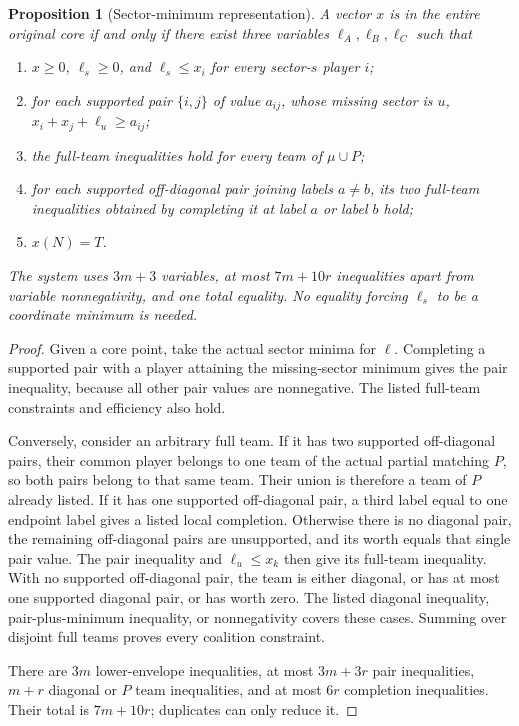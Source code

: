 \documentclass[11pt]{article}
\newtheorem{proposition}[theorem]{Proposition}
\theoremstyle{remark}
\begin{document}
\begin{proposition}[Sector-minimum representation]\label{anc:compression}
A vector $x$ is in the entire original core if and only if there exist
three variables $\ell_A,\ell_B,\ell_C$ such that
\begin{enumerate}
\item $x\ge0$, $\ell_s\ge0$, and $\ell_s\le x_i$ for every sector-$s$
player $i$;
\item for each supported pair $\{i,j\}$ of value $a_{ij}$, whose missing
sector is $u$, $x_i+x_j+\ell_u\ge a_{ij}$;
\item the full-team inequalities hold for every team of $\mu\cup P$;
\item for each supported off-diagonal pair joining labels $a\ne b$, its
two full-team inequalities obtained by completing it at label $a$ or
label $b$ hold;
\item $x(N)=T$.
\end{enumerate}
The system uses $3m+3$ variables, at most $7m+10r$ inequalities apart
from variable nonnegativity, and one total equality. No equality forcing
$\ell_s$ to be a coordinate minimum is needed.
\end{proposition}
\begin{proof}
Given a core point, take the actual sector minima for $\ell$.
Completing a supported pair with a player attaining the missing-sector
minimum gives the pair inequality, because all other pair values are
nonnegative. The listed full-team constraints and efficiency also hold.

Conversely, consider an arbitrary full team. If it has two supported
off-diagonal pairs, their common player belongs to one team of the
actual partial matching $P$, so both pairs belong to that same team.
Their union is therefore a team of $P$ already listed. If it has one
supported off-diagonal pair, a third label equal to one endpoint label
gives a listed local completion. Otherwise there is no diagonal pair,
the remaining off-diagonal pairs are unsupported, and its worth equals
that single pair value. The pair inequality and $\ell_u\le x_k$
then give its full-team inequality. With no supported off-diagonal
pair, the team is either diagonal, or has at most one supported diagonal
pair, or has worth zero. The listed diagonal inequality, pair-plus-minimum
inequality, or nonnegativity covers these cases. Summing over disjoint
full teams proves every coalition constraint.

There are $3m$ lower-envelope inequalities, at most $3m+3r$ pair
inequalities, $m+r$ diagonal or $P$ team inequalities, and at most
$6r$ completion inequalities. Their total is $7m+10r$; duplicates can
only reduce it.
\end{proof}
\end{document}
